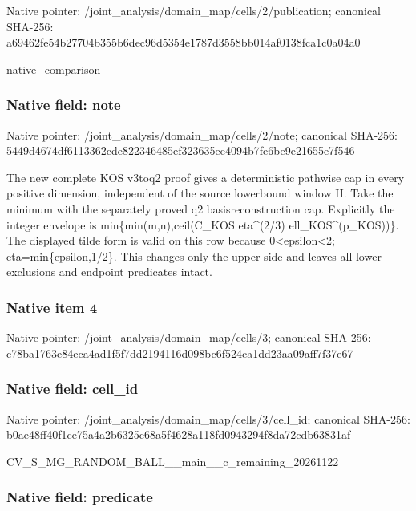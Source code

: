 \documentclass[10pt,a4paper]{article}
\begin{document}
Native pointer: /joint\_analysis/domain\_m\allowbreak{}ap/cells/2/publication; canonical SHA-256: a69462fe54b27704b355b6de\allowbreak{}c96d5354e1787d3558bb014a\allowbreak{}f0138fca1c0a04a0


native\_comparison


\subsubsection{Native field: note}


Native pointer: /joint\_analysis/domain\_map/cells/2/note; canonical SHA-256: 5449d4674df6113362cde822\allowbreak{}346485ef323635ee4094b7fe\allowbreak{}6be9e21655e7f546


The new complete KOS v3toq2 proof gives a deterministic pathwise cap in every positive dimension, independent of the source lowerbound window H. Take the minimum with the separately proved q2 basisreconstruction cap. Explicitly the integer envelope is min\{min(m,n),ceil(C\_KOS eta\textasciicircum{}(2/3) ell\_KOS\textasciicircum{}(p\_KOS))\}. The displayed tilde form is valid on this row because 0<epsilon<2; eta=min\{epsilon,1/2\}. This changes only the upper side and leaves all lower exclusions and endpoint predicates intact.


\subsubsection{Native item 4}


Native pointer: /joint\_analysis/domain\_map/cells/3; canonical SHA-256: c78ba1763e84eca4ad1f5f7d\allowbreak{}d2194116d098bc6f524ca1dd\allowbreak{}23aa09aff7f37e67



\subsubsection{Native field: cell\_id}


Native pointer: /joint\_analysis/domain\_m\allowbreak{}ap/cells/3/cell\_id; canonical SHA-256: b0ae48ff40f1ce75a4a2b632\allowbreak{}5c68a5f4628a118fd0943294\allowbreak{}f8da72cdb63831af


CV\_S\_MG\_RANDOM\_BALL\_\_mai\allowbreak{}n\_\_c\_remaining\_20261122


\subsubsection{Native field: predicate}
\end{document}
